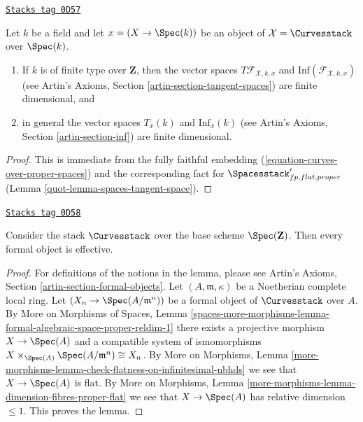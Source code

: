 \begin{lemma}
\label{quot-lemma-curves-tangent-space}
\href{https://stacks.math.columbia.edu/tag/0D57}{\texttt{Stacks tag 0D57}}

Let $k$ be a field and let $x = (X \to \Spec(k))$ be an object of
$\mathcal{X} = \Curvesstack$ over $\Spec(k)$.
\begin{enumerate}
\item If $k$ is of finite type over $\mathbf{Z}$, then
the vector spaces $T\mathcal{F}_{\mathcal{X}, k, x}$ and
$\text{Inf}(\mathcal{F}_{\mathcal{X}, k, x})$
(see Artin's Axioms, Section \ref{artin-section-tangent-spaces})
are finite dimensional, and
\item in general the vector spaces $T_x(k)$ and $\text{Inf}_x(k)$
(see Artin's Axioms, Section \ref{artin-section-inf})
are finite dimensional.
\end{enumerate}
\end{lemma}

\begin{proof}

This is immediate from the fully faithful embedding
(\ref{equation-curves-over-proper-spaces}) and
the corresponding fact for $\Spacesstack'_{fp, flat, proper}$
(Lemma \ref{quot-lemma-spaces-tangent-space}).
\end{proof}

\begin{lemma}
\label{quot-lemma-curves-existence}
\href{https://stacks.math.columbia.edu/tag/0D58}{\texttt{Stacks tag 0D58}}

Consider the stack $\Curvesstack$ over the base
scheme $\Spec(\mathbf{Z})$. Then every formal object is effective.
\end{lemma}

\begin{proof}
For definitions of the notions in the lemma, please see
Artin's Axioms, Section \ref{artin-section-formal-objects}.
Let $(A, \mathfrak m, \kappa)$ be a Noetherian complete
local ring. Let $(X_n \to \Spec(A/\mathfrak m^n))$
be a formal object of $\Curvesstack$ over $A$.
By More on Morphisms of Spaces, Lemma
\ref{spaces-more-morphisms-lemma-formal-algebraic-space-proper-reldim-1}
there exists a projective morphism $X \to \Spec(A)$
and a compatible system of ismomorphisms
$X \times_{\Spec(A)} \Spec(A/\mathfrak m^n) \cong X_n$. By
More on Morphisms, Lemma
\ref{more-morphisms-lemma-check-flatness-on-infinitesimal-nbhds}
we see that $X \to \Spec(A)$ is flat. By More on Morphisms, Lemma
\ref{more-morphisms-lemma-dimension-fibres-proper-flat}
we see that $X \to \Spec(A)$ has relative dimension $\leq 1$.
This proves the lemma.
\end{proof}

